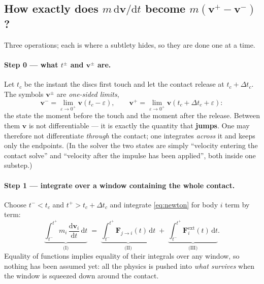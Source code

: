 \documentclass[a4paper,11pt]{article}
\newcommand{\vV}{\bm{v}}
\newcommand{\dtc}{\Delta t_c}     %
\newcommand{\dd}{\mathrm{d}}
\begin{document}
\subsection{How exactly does $m\,\dd\vV/\dd t$ become $m(\vV^+-\vV^-)$?}
\label{sec:jump}

Three operations; each is where a subtlety hides, so they are done one at a time.

\paragraph{Step 0 --- what $t^\pm$ and $\vV^\pm$ are.}
Let $t_c$ be the instant the discs first touch and let the contact release at
$t_c+\dtc$. The symbols $\vV^\pm$ are \emph{one-sided limits},
\[
  \vV^-=\lim_{\varepsilon\to0^+}\vV(t_c-\varepsilon),
  \qquad
  \vV^+=\lim_{\varepsilon\to0^+}\vV(t_c+\dtc+\varepsilon):
\]
the state the moment before the touch and the moment after the release. Between
them $\vV$ is not differentiable --- it is exactly the quantity that
\textbf{jumps}. One may therefore not differentiate \emph{through} the contact;
one integrates \emph{across} it and keeps only the endpoints. (In the solver the
two states are simply ``velocity entering the contact solve'' and ``velocity
after the impulse has been applied'', both inside one substep.)

\paragraph{Step 1 --- integrate over a window containing the whole contact.}
Choose $t^-<t_c$ and $t^+>t_c+\dtc$ and integrate \eqref{eq:newton} for body
$i$ term by term:
\begin{equation}
  \underbrace{\int_{t^-}^{t^+} m_i\,\frac{\dd\vV_i}{\dd t}\,\dd t}_{\text{(I)}}
  \;=\;
  \underbrace{\int_{t^-}^{t^+}\bm F_{j\to i}(t)\,\dd t}_{\text{(II)}}
  \;+\;
  \underbrace{\int_{t^-}^{t^+}\bm F_i^{\text{ext}}(t)\,\dd t}_{\text{(III)}} .
  \label{eq:window}
\end{equation}
Equality of functions implies equality of their integrals over any window, so
nothing has been assumed yet: all the physics is pushed into \emph{what
survives} when the window is squeezed down around the contact.
\end{document}
